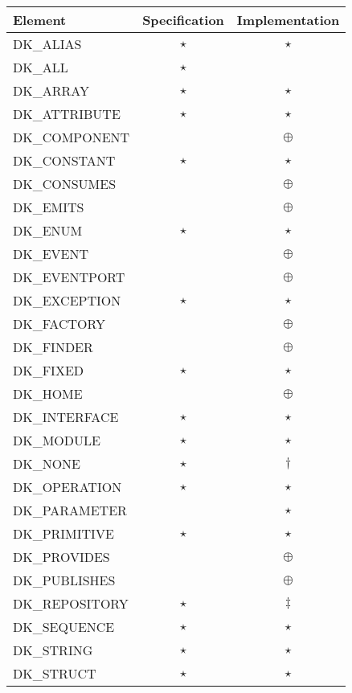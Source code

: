 \begin{table}
\centering
\begin{tabular}{|l|c|c|}
\hline
Element           & Specification & Implementation \\ \hline \hline
DK\_ALIAS         & $\star$ & $\star$    \\
DK\_ALL           & $\star$ &            \\
DK\_ARRAY         & $\star$ & $\star$    \\
DK\_ATTRIBUTE     & $\star$ & $\star$    \\
DK\_COMPONENT     &         & $\oplus$   \\ \hline
DK\_CONSTANT      & $\star$ & $\star$    \\
DK\_CONSUMES      &         & $\oplus$   \\
DK\_EMITS         &         & $\oplus$   \\
DK\_ENUM          & $\star$ & $\star$    \\
DK\_EVENT         &         & $\oplus$   \\ \hline
DK\_EVENTPORT     &         & $\oplus$   \\
DK\_EXCEPTION     & $\star$ & $\star$    \\
DK\_FACTORY       &         & $\oplus$   \\
DK\_FINDER        &         & $\oplus$   \\
DK\_FIXED         & $\star$ & $\star$    \\ \hline
DK\_HOME          &         & $\oplus$   \\
DK\_INTERFACE     & $\star$ & $\star$    \\
DK\_MODULE        & $\star$ & $\star$    \\
DK\_NONE          & $\star$ & $\dagger$  \\
DK\_OPERATION     & $\star$ & $\star$    \\ \hline
DK\_PARAMETER     &         & $\star$    \\
DK\_PRIMITIVE     & $\star$ & $\star$    \\
DK\_PROVIDES      &         & $\oplus$   \\
DK\_PUBLISHES     &         & $\oplus$   \\
DK\_REPOSITORY    & $\star$ & $\ddagger$ \\ \hline
DK\_SEQUENCE      & $\star$ & $\star$    \\
DK\_STRING        & $\star$ & $\star$    \\
DK\_STRUCT        & $\star$ & $\star$    \\

\end{tabular}
\end{table}
